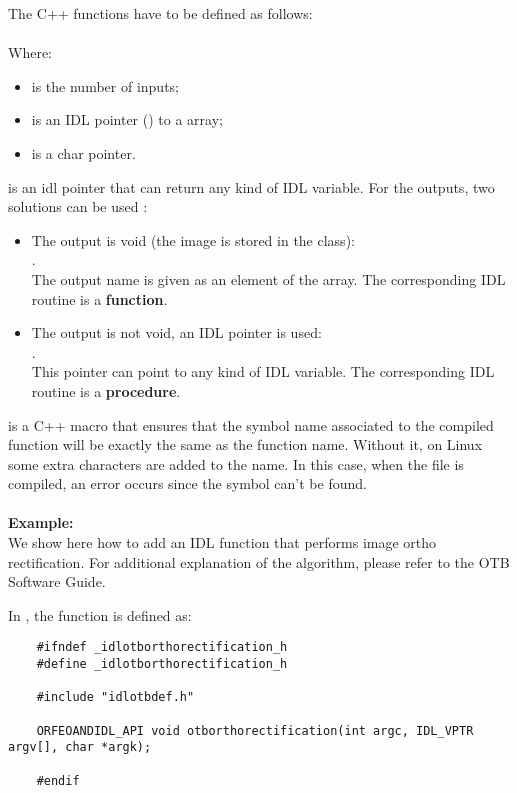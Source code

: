The C++ functions have to be defined as follows:\\
\\
Where:
\begin{itemize}
    \item {} is the number of inputs;
    \item {} is an IDL pointer () to a  array;
    \item {} is a char pointer.
\end{itemize}
 is an idl pointer that can return any kind of IDL variable.
For the outputs, two solutions can be used :
\begin{itemize}
\item The output is void (the image is stored in the class): \\ 
.\\
  The output name is given as an element of the  array. The corresponding IDL routine is a \textbf{function}.
\item The output is not void, an IDL pointer is used: \\ 
.\\
  This pointer can point to any kind of IDL variable. The corresponding IDL routine is a \textbf{procedure}.
\end{itemize}
 is a C++ macro that ensures that the symbol name associated to the compiled function will be exactly the same as the function name. Without it, 
on Linux some extra characters are added to the name. In this case, when the  file is compiled, an error occurs since the symbol can't be found. \\
\\
\textbf{Example:}\\
      We show here how to add an IDL function that performs image ortho rectification. For additional explanation of the algorithm, please refer to the OTB Software Guide.

      In , the function is defined as:
\begin{verbatim}
    #ifndef _idlotborthorectification_h
    #define _idlotborthorectification_h

    #include "idlotbdef.h"

    ORFEOANDIDL_API void otborthorectification(int argc, IDL_VPTR argv[], char *argk);

    #endif

\end{verbatim}

